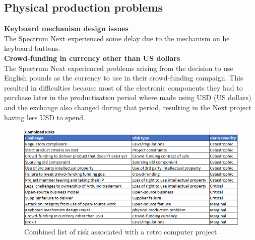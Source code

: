 \subsection{Physical production problems}

\textbf{Keyboard mechanism design issues}\\
The Spectrum Next experienced some delay due to the mechanism on he keyboard buttons.\\ 

\textbf{Crowd-funding in currency other than US dollars}\\
The Spectrum Next experienced problems arising from the decision to use English pounds as the currency to use in their crowd-funding campaign. This resulted in difficulties because most of the electronic components they had to purchase later in the productisation period where made using USD (US dollars) and the exchange also changed during that period, resulting in the Next project having less USD to spend.\\ 



\begin{figure} \begin{center}
\includegraphics[width= 1\linewidth]{pics/risk_list} 
\end{center} 
\caption{Combined list of risk associated with a retro computer project}
\label{case_study_process}
\end{figure} 